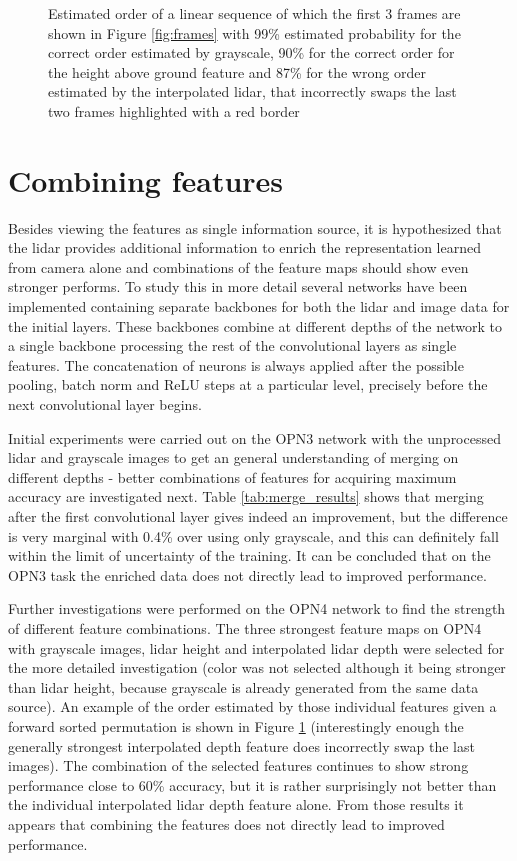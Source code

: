 \begin{figure}[t!]
\caption{Estimated order of a linear sequence of which the first 3 frames are shown in Figure \ref{fig:frames} with 99\% estimated probability for the correct order estimated by grayscale, 90\% for the correct order for the height above ground feature and 87\% for the wrong order estimated by the interpolated lidar, that incorrectly swaps the last two frames highlighted with a red border}
\label{fig:orderings}
\end{figure}

\section{Combining features}
Besides viewing the features as single information source, it is hypothesized that the lidar provides additional information to enrich the representation learned from camera alone and combinations of the feature maps should show even stronger performs. To study this in more detail several networks have been implemented containing separate backbones for both the lidar and image data for the initial layers. These backbones combine at different depths of the network to a single backbone processing the rest of the convolutional layers as single features. The concatenation of neurons is always applied after the possible pooling, batch norm and ReLU steps at a particular level, precisely before the next convolutional layer begins.

Initial experiments were carried out on the OPN3 network with the unprocessed lidar and grayscale images to get an general understanding of merging on different depths - better combinations of features for acquiring maximum accuracy are investigated next. Table \ref{tab:merge_results} shows that merging after the first convolutional layer gives indeed an improvement, but the difference is very marginal with 0.4\% over using only grayscale, and this can definitely fall within the limit of uncertainty of the training. It can be concluded that on the OPN3 task the enriched data does not directly lead to improved performance. 

Further investigations were performed on the OPN4 network to find the strength of different feature combinations. The three strongest feature maps on OPN4 with grayscale images, lidar height and interpolated lidar depth were selected for the more detailed investigation (color was not selected although it being stronger than lidar height, because grayscale is already generated from the same data source). An example of the order estimated by those individual features given a forward sorted permutation is shown in Figure \ref{fig:orderings} (interestingly enough the generally strongest interpolated depth feature does incorrectly swap the last images). The combination of the selected features continues to show strong performance close to 60\% accuracy, but it is rather surprisingly not better than the individual interpolated lidar depth feature alone. From those results it appears that combining the features does not directly lead to improved performance. 

